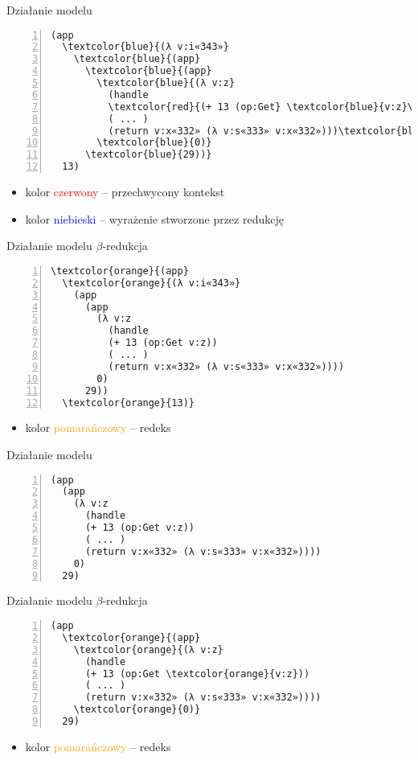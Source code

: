 \documentclass{beamer}
\begin{document}
\begin{frame}[fragile]{Działanie modelu}
\begin{Verbatim}[commandchars=\\\{\},numbers=left]
(app
  \textcolor{blue}{(λ v:i«343»}
    \textcolor{blue}{(app}
      \textcolor{blue}{(app}
        \textcolor{blue}{(λ v:z}
          (handle
          \textcolor{red}{(+ 13 (op:Get} \textcolor{blue}{v:z}\textcolor{red}{))}
          ( ... )
          (return v:x«332» (λ v:s«333» v:x«332»)))\textcolor{blue}{)}
        \textcolor{blue}{0)}
      \textcolor{blue}{29))}
  13)
\end{Verbatim}
\begin{itemize}
  \item kolor \textcolor{red}{czerwony} -- przechwycony kontekst
  \item kolor \textcolor{blue}{niebieski} -- wyrażenie stworzone przez redukcję
\end{itemize}
\end{frame}

\begin{frame}[fragile]{Działanie modelu}
$\beta$-redukcja
\begin{Verbatim}[commandchars=\\\{\},numbers=left]
\textcolor{orange}{(app}
  \textcolor{orange}{(λ v:i«343»}
    (app
      (app
        (λ v:z
          (handle
          (+ 13 (op:Get v:z))
          ( ... )
          (return v:x«332» (λ v:s«333» v:x«332»))))
        0)
      29))
  \textcolor{orange}{13)}
\end{Verbatim}
\begin{itemize}
  \item kolor \textcolor{orange}{pomarańczowy} -- redeks
\end{itemize}
\end{frame}

\begin{frame}[fragile]{Działanie modelu}
\begin{Verbatim}[commandchars=\\\{\},numbers=left]
(app
  (app
    (λ v:z
      (handle
      (+ 13 (op:Get v:z))
      ( ... )
      (return v:x«332» (λ v:s«333» v:x«332»))))
    0)
  29)
\end{Verbatim}
\end{frame}

\begin{frame}[fragile]{Działanie modelu}
$\beta$-redukcja
\begin{Verbatim}[commandchars=\\\{\},numbers=left]
(app
  \textcolor{orange}{(app}
    \textcolor{orange}{(λ v:z}
      (handle
      (+ 13 (op:Get \textcolor{orange}{v:z}))
      ( ... )
      (return v:x«332» (λ v:s«333» v:x«332»))))
    \textcolor{orange}{0)}
  29)
\end{Verbatim}
\begin{itemize}
  \item kolor \textcolor{orange}{pomarańczowy} -- redeks
\end{itemize}
\end{frame}
\end{document}
